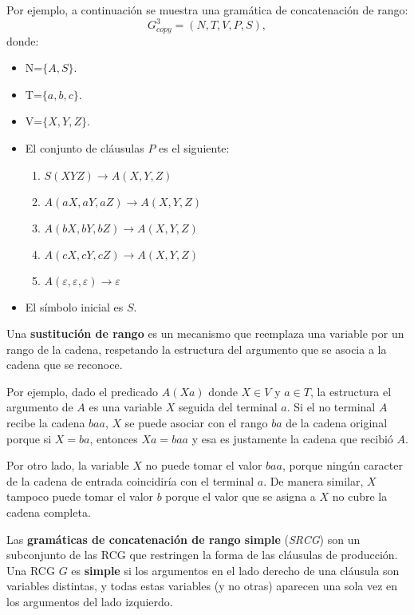 Por ejemplo, a continuación se muestra una gramática de concatenación de rango:
\label{g_3copy}
\[
    G^3_{copy} = (N, T, V, P, S),
\]
donde:

\begin{itemize}
    \item  N=$\{A,S\}$.
    \item T=$\{a,b,c\}$.
    \item V=$\{X,Y,Z\}$.
    \item El conjunto de cláusulas $P$ es el siguiente:
          \begin{enumerate}
              \item $S(XYZ)\to A(X,Y,Z)$
              \item $A(aX,aY,aZ)\to A(X,Y,Z)$
              \item $A(bX,bY,bZ)\to A(X,Y,Z)$
              \item $A(cX,cY,cZ)\to A(X,Y,Z)$
              \item $A(\varepsilon,\varepsilon,\varepsilon)\to \varepsilon$
          \end{enumerate}
    \item El símbolo inicial es $S$.
\end{itemize}

\begin{definition}
    Una \textbf{sustitución de rango} es un mecanismo que reemplaza una variable por un 
    rango de la cadena, respetando la estructura del argumento que se asocia a la cadena que se reconoce. 
\end{definition}

Por ejemplo, dado el predicado $A(Xa)$ donde $X \in V$ y $a \in T$, la estructura el argumento de $A$ es una 
variable $X$ seguida del terminal $a$. Si el no terminal $A$ recibe la cadena $baa$, $X$ se puede asociar 
con el rango $ba$ de la cadena original porque si $X=ba$, entonces  $Xa=baa$ y esa es justamente la cadena 
que recibió $A$.

Por otro lado, la variable $X$ no puede tomar el valor $baa$, porque ningún caracter de la cadena de entrada coincidiría con el terminal $a$. De manera similar, $X$ tampoco puede tomar el valor $b$ porque el valor que se asigna a $X$ no cubre la cadena completa.

\begin{definition}
    Las \textbf{gramáticas de concatenación de rango simple}
    (\textit{SRCG}) son un subconjunto de las RCG que restringen la forma de las cláusulas de producción.  
    Una RCG $G$ es \textbf{simple} si los argumentos en el lado derecho de una cláusula son variables distintas, 
    y todas estas variables (y no otras) aparecen una sola vez en los argumentos del lado izquierdo.  
\end{definition}

